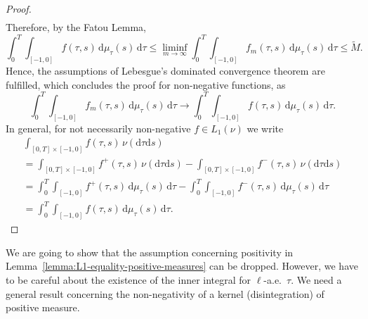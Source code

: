 \documentclass[reqno]{amsart}
\theoremstyle{plain}
\numberwithin{equation}{section}
\numberwithin{definition}{section}
\newcommand{\dd}{\ensuremath{\mathrm{d}}}
\begin{document}
\begin{proof}
\begin{align*}
\end{align*}
Therefore, by the Fatou Lemma, 
\begin{equation*}
     \int_0^{T}\int_{[-1,0]} f(\tau,s)\, \dd \mu_{\tau} (s) \,\dd \tau \le \liminf_{m\to\infty} \int_0^{T}\int_{[-1,0]} f_m(\tau,s)\, \dd \mu_{\tau} (s) \,\dd \tau  \le \widetilde{M}. 
\end{equation*}
Hence, the assumptions of Lebesgue's dominated convergence theorem are fulfilled, which concludes the proof for non-negative functions, as
\begin{equation*}
     \int_0^{T}\int_{[-1,0]} f_m(\tau,s)\, \dd \mu_{\tau} (s) \,\dd \tau \to\int_0^{T}\int_{[-1,0]} f(\tau,s)\, \dd \mu_{\tau} (s) \,\dd \tau.
\end{equation*}
In general, for not necessarily non-negative $f\in L_1(\nu)$ we write 
\begin{multline*}
        \int_{[0,T]\times [-1,0]} f(\tau,s) \, \nu(\dd \tau  \dd s ) \\ = \int_{[0,T]\times [-1,0]} f^+(\tau,s) \, \nu(\dd \tau  \dd s ) - \int_{[0,T]\times [-1,0]} f^-(\tau,s) \, \nu(\dd \tau  \dd s ) \\ 
         = \int_0^{T}\int_{[-1,0]} f^+(\tau,s)\, \dd \mu_{\tau} (s) \,\dd \tau -  \int_0^{T}\int_{[-1,0]} f^-(\tau,s)\, \dd \mu_{\tau} (s) \,\dd \tau \\ 
         = \int_0^{T}\int_{[-1,0]} f(\tau,s)\, \dd \mu_{\tau} (s) \,\dd \tau. 
\end{multline*}
\end{proof}
We are going to show that the assumption concerning positivity in Lemma~\ref{lemma:L1-equality-positive-measures} can be dropped. However, we have to be careful about the existence of the inner integral for $\ell$-a.e.\ $\tau$. We need a general result concerning the non-negativity of a kernel (disintegration) of positive measure.      
\end{document}
